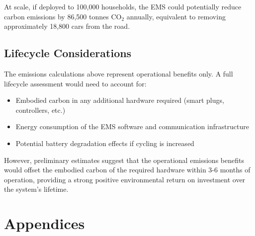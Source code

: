 \documentclass[12pt,a4paper]{article}
\begin{document}
At scale, if deployed to 100,000 households, the EMS could potentially reduce carbon emissions by 86,500 tonnes CO$_2$ annually, equivalent to removing approximately 18,800 cars from the road.

\subsection{Lifecycle Considerations}

The emissions calculations above represent operational benefits only. A full lifecycle assessment would need to account for:

\begin{itemize}
    \item Embodied carbon in any additional hardware required (smart plugs, controllers, etc.)
    \item Energy consumption of the EMS software and communication infrastructure
    \item Potential battery degradation effects if cycling is increased
\end{itemize}

However, preliminary estimates suggest that the operational emissions benefits would offset the embodied carbon of the required hardware within 3-6 months of operation, providing a strong positive environmental return on investment over the system's lifetime.

\clearpage

\section*{Appendices}
\end{document}
